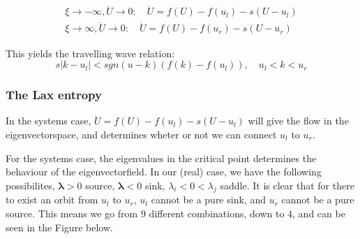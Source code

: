 \documentclass{article}
\numberwithin{equation}{section}
\begin{document}
\begin{align*}
    \xi \rightarrow -\infty, \dot U \rightarrow 0: \quad \dot U = f(U) - f(u_l) - s(U-u_l) \\
    \xi \rightarrow \infty, \dot U \rightarrow 0: \quad  \dot U = f(U) - f(u_r) - s(U-u_r)
    \label{travelling wave}
\end{align*}

This yields the travelling wave relation: 
\begin{equation*}
    s|k-u_l| < sgn(u-k)(f(k)-f(u_l)), \quad u_l < k < u_r
\end{equation*}

\subsubsection{The Lax entropy}\label{The Lax entropy}

In the systems case, $\dot U = f(U) - f(u_l) - s(U-u_l)$ will give the flow in the eigenvectorspace, and determines wheter or not we can connect $u_l$ to $u_r$. 

For the systems case, the eigenvalues in the critical point determines the behaviour of the eigenvectorfield. In our (real) case, we have the following possibilites, $\boldsymbol{\lambda} > 0 $ source, $\boldsymbol{\lambda} < 0 $ sink, $\lambda_i < 0 < \lambda_j $ saddle. \cite{VerhulstFerdinand1990NDEa}
It is clear that for there to exist an orbit from $u_l$ to $u_r$, $u_l$ cannot be a pure sink, and $u_r$ cannot be a pure source. This means we go from $9$ different combinations, down to $4$, and can be seen in the Figure below. 
\end{document}

